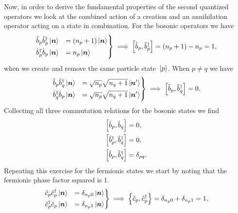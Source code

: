             Now, in order to derive the fundamental properties of the second
            quantized operators we look at the combined action of a creation and
            an annihilation operator acting on a state in combination.
            For the bosonic operators we have
            \begin{align}
                \begin{drcases}
                    \ban{p}\bcr{p}\ket*{\vfg{n}}
                    &= (n_p + 1)\ket*{\vfg{n}}
                    \\
                    \bcr{p}\ban{p}\ket*{\vfg{n}}
                    &= n_p \ket*{\vfg{n}}
                \end{drcases}
                \implies
                \com{\ban{p}}{\bcr{p}}
                = (n_p + 1) - n_p = 1,
            \end{align}
            when we create and remove the same particle state $\ket*{p}$.
            When $p \neq q$ we have
            \begin{align}
                \begin{drcases}
                    \ban{p}\bcr{q}\ket*{\vfg{n}}
                    &= \sqrt{n_p}\sqrt{n_q + 1}\ket*{\vfg{n}'}
                    \\
                    \bcr{q}\ban{p}\ket*{\vfg{n}}
                    &= \sqrt{n_p}\sqrt{n_q + 1}\ket*{\vfg{n}'}
                \end{drcases}
                \implies
                \com{\ban{p}}{\bcr{q}}
                = 0.
            \end{align}
            Collecting all three commutation relations for the bosonic states we
            find
            \begin{align}
                \left[\hat{b}_{p}, \hat{b}_{q}\right] &= 0, \\
                \left[\hat{b}_{p}^{\dagger}, \hat{b}_{q}^{\dagger}\right] &= 0, \\
                \left[\hat{b}_{p}, \hat{b}_{q}^{\dagger}\right] &= \delta_{pq}.
            \end{align}
            Repeating this exercise for the fermionic states we start by noting
            that the fermionic phase factor squared is $1$.
            \begin{align}
                \begin{drcases}
                    \can{p}\ccr{p}\ket*{\vfg{n}}
                    &= \delta_{n_p0}\ket*{\vfg{n}}
                    \\
                    \ccr{p}\can{p}\ket*{\vfg{n}}
                    &= \delta_{n_p1}\ket*{\vfg{n}}
                \end{drcases}
                \implies
                \acom{\can{p}}{\ccr{p}}
                = \delta_{n_p 0} + \delta_{n_p 1}
                = 1,
            \end{align}
